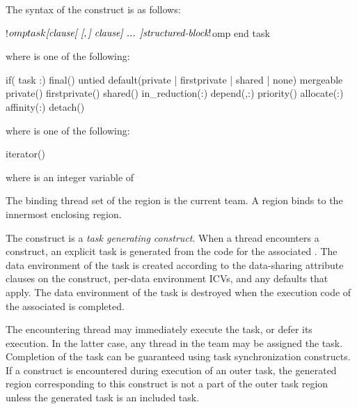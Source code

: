 \begin{fortranspecific}
The syntax of the  construct is as follows:

\begin{ompfPragma}
!$omp task \plc{[clause[ [},\plc{] clause] ... ]}
    \plc{structured-block}
!$omp end task
\end{ompfPragma}

where  is one of the following{}:

\begin{indentedcodelist}
if(\plc{[} task :\plc{] scalar-logical-expression})
final()
untied
default(private \textnormal{|} firstprivate \textnormal{|} shared \textnormal{|} none)
mergeable
private()
firstprivate()
shared()
in_reduction(:)
depend(\plc{[depend-modifier},\plc{] dependence-type }:)
priority()
allocate(\plc{[allocator }:\plc{] list})
affinity(\plc{[aff-modifier }:\plc{] locator-list})
detach()
\end{indentedcodelist}

where  is one of the following{}:
\begin{indentedcodelist}
iterator() 
\end{indentedcodelist}

where  is an integer variable of  
\end{fortranspecific}

\binding
The binding thread set of the  region is the current team. A 
 region binds to the innermost enclosing  region.

\descr

The  construct is a \emph{task generating construct}. When a thread
encounters a  construct, an explicit task is generated from the code
for the associated . The data environment of the task is
created according to the data-sharing attribute clauses on the 
construct, per-data environment ICVs, and any defaults that apply. The data 
environment of the task is destroyed when the execution code of the associated 
 is completed.

The encountering thread may immediately execute the task, or defer its execution. 
In the latter case, any thread in the team may be assigned the task. Completion 
of the task can be guaranteed using task synchronization constructs.
If a  construct is encountered during execution of an outer
task, the generated  region corresponding to this construct is not a
part of the outer task region unless the generated task is
an included task.

